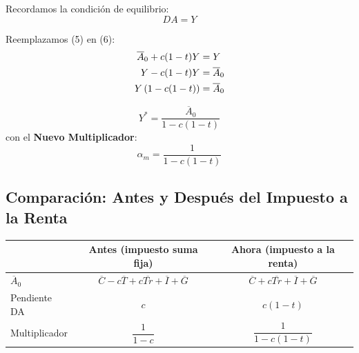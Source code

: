 \documentclass[11pt,a4paper]{article}
\newcommand{\barvar}[1]{\overline{#1}}
\begin{document}
Recordamos la condición de equilibrio:
\begin{equation}
DA = Y \tag{6}
\end{equation}

Reemplazamos (5) en (6):
\begin{align}
\barvar{A}_0 + c(1-t)Y &= Y \notag \\
Y - c(1-t)Y &= \barvar{A}_0 \notag \\
Y\left(1 - c(1-t)\right) &= \barvar{A}_0 \notag
\end{align}

\begin{resultadobox}
\begin{equation}
Y^* = \frac{\barvar{A}_0}{1 - c(1-t)}
\end{equation}
con el \textbf{Nuevo Multiplicador}:
\[
\alpha_m = \frac{1}{1 - c(1-t)}
\]
\end{resultadobox}

\subsection{Comparación: Antes y Después del Impuesto a la Renta}

\begin{center}
\begin{tabular}{lcc}
 & \textbf{Antes} (impuesto suma fija) & \textbf{Ahora} (impuesto a la renta) \\
\hline
$\barvar{A}_0$ & $\barvar{C} - c\barvar{T} + c\barvar{Tr} + \barvar{I} + \barvar{G}$ & $\barvar{C} + c\barvar{Tr} + \barvar{I} + \barvar{G}$ \\[8pt]
Pendiente DA & $c$ & $c(1-t)$ \\[8pt]
Multiplicador & $\dfrac{1}{1-c}$ & $\dfrac{1}{1-c(1-t)}$ \\[8pt]
\end{tabular}
\end{center}
\end{document}
